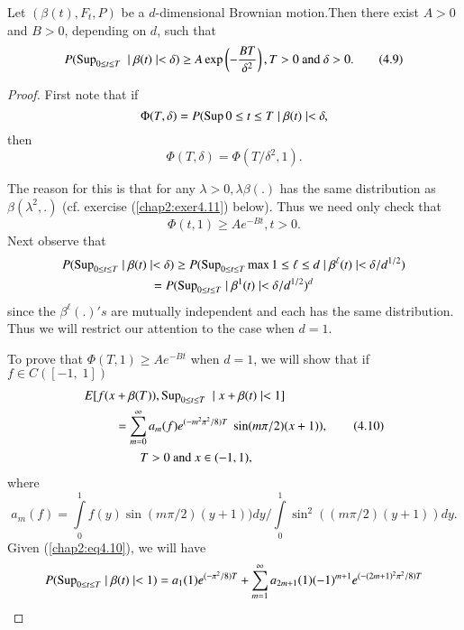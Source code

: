 \setcounter{lemma}{7}
\begin{lemma}\label{chap2:lem4.8}%
Let $(\beta(t), F_t, P )$  be a $d$-dimensional Brownian
motion.\break Then there exist $A > 0$ and $B > 0$, depending on $d$,
such that  
\begin{equation*}
P ( \operatorname{Sup}_{ 0 \leq t \leq T} ~ \mid \beta (t)  \mid  < \delta ) \ge A
\exp \left( -\frac{BT}{\delta^2} \right), T > 0 \text{ and }  \delta >
0. \tag{4.9}\label{chap2:eq4.9}  
\end{equation*}
\end{lemma}

\begin{proof}
 First note that if 
 $$
 \Phi ( T, \delta )  =  P ( \operatorname{Sup}{ 0 \leq t \leq T} \mid  \beta (t) 
 \mid  < \delta, 
 $$
 then 
 $$
\Phi ( T, \delta )  =   \Phi ( T / \delta^2, 1 ).  
 $$

The reason for this  is that for any  $\lambda > 0, \lambda \beta (.)$
has the same distribution as  $ \beta ( \lambda^2 ,.)$ (cf. exercise 
(\ref{chap2:exer4.11}) below). Thus we need only check that  
$$
 \Phi (t,1 ) \ge  A e^{-Bt}, t > 0.
$$
Next observe that 
\begin{gather*}
P ( \operatorname{Sup}_{ 0 \leq t \leq T}  \mid \beta (t)  \mid  < \delta ) \ge P
( \operatorname{Sup}_{ 0 \leq t \leq T} \max{ 1 \leq \ell \leq d}  \mid
\beta^\ell (t)  \mid  < \delta / d^{1/2} ) \\ 
=  P ( \operatorname{Sup}_{ 0 \leq t \leq T}  \mid \beta^1  (t)  \mid  < \delta /
d^{1/2} )^d 
\end{gather*}\pageoriginale
since the  $ \beta^\ell (.) 's $ are  mutually independent and  each 
has the same distribution. Thus we will restrict our attention to the
case when  $d = 1$. 

To prove that  $ \Phi (T,1) \ge A e^{-Bt} $ when  $ d = 1 $, we will
show that if $f \in C ([-1, \; 1])$  
\begin{align*}
E [ f ( x & +  \beta (T)), \operatorname{Sup}_{ 0 \leq t \leq T} ~  \mid x + \beta (t)
  \mid  < 1 ] \\ 
& = \sum^{\infty}_{m=0} a_m (f) e^{(-m^2 \pi^2 /8 ) T} ~ \sin  (m
\pi /2)   (x +1 )), \tag{4.10}\label{chap2:eq4.10} \\
& \qquad T > 0  \text{ and  } x \in ( -1,1 ),
\end{align*}
where
$$ 
a_m (f) = \int\limits^{1}_{0}  f (y) \sin ( m \pi /2 ) ( y +1 ))  
dy/ \int\limits^{1}_{0} \sin^2 (( m \pi /2 ) (y+1)) dy.
$$
Given (\ref{chap2:eq4.10}), we will have 
{\fontsize{10pt}{12pt}\selectfont
$$
P (\operatorname{Sup}_{0 \leq t \leq T } \mid \beta (t) \mid < 1) = a_1 (1) e^{(-
  \pi^2 /8)T } + \sum^{\infty}_{m=1} a_{2m +1} (1) (-1)^{ m+1}e^{(-(
  2m +1)^2 \pi^2/8) T} 
$$}\relax


\end{proof}
